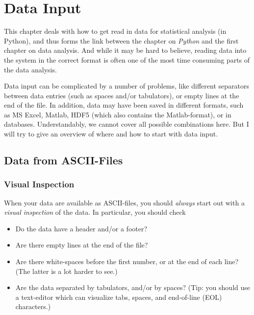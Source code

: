 \chapter{Data Input}

This chapter deals with how to get read in data for statistical analysis (in Python), and thus forms the link between the chapter on \emph{Python} and the first chapter on data analysis. And while it may be hard to believe, reading data into the system in the correct format is often one of the most time consuming parts of the data analysis.

\vspace{5 mm}

Data input can be complicated by a number of problems, like different separators between data entries (such as spaces and/or tabulators), or empty lines at the end of the file. In addition, data may have been saved in different formats, such as MS Excel, Matlab,  HDF5 (which also contains the Matlab-format), or in databases. Understandably, we cannot cover all possible combinations here. But I will try to give an overview of where and how to start with data input.

\section{Data from ASCII-Files}

\subsection{Visual Inspection}

When your data are available as ASCII-files, you should \emph{always } start out with a \emph{visual inspection }of the data. In particular, you should check

\begin{itemize}
  \item Do the data have a header and/or a footer?
  \item Are there empty lines at the end of the file?
  \item Are there white-spaces before the first number, or at the end of each line? (The latter is a lot harder to see.)
  \item Are the data separated by tabulators, and/or by spaces? (Tip: you should use a text-editor which can visualize tabs, spaces, and end-of-line (EOL) characters.)
\end{itemize}

